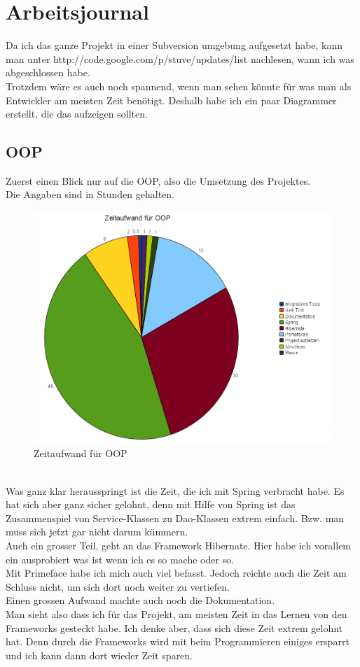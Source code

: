 \section{Arbeitsjournal}
Da ich das ganze Projekt in einer Subversion umgebung aufgesetzt habe, kann man unter http://code.google.com/p/stuve/updates/list nachlesen, wann ich was abgeschlossen habe.\\
 Trotzdem wäre es auch noch spannend, wenn man sehen könnte für was man als Entwickler am meisten Zeit benötigt. Deshalb habe ich ein paar Diagrammer erstellt, die das aufzeigen sollten.
\subsection{OOP}
Zuerst einen Blick nur auf die OOP, also die Umsetzung des Projektes.\\
Die Angaben sind in Stunden gehalten.
\begin{figure}[ht]
\begin{center}
\includegraphics[width=15cm]{images/OOP.png}
\caption{Zeitaufwand für OOP}
\end{center}
\end{figure}
\\
Was ganz klar herausspringt ist die Zeit, die ich mit Spring verbracht habe. Es hat sich aber ganz sicher gelohnt, denn mit Hilfe von Spring ist das Zusammenspiel von Service-Klassen zu Dao-Klassen extrem einfach. Bzw. man muss sich jetzt gar nicht darum kümmern.\\
Auch ein grosser Teil, geht an das Framework Hibernate. Hier habe ich vorallem ein ausprobiert was ist wenn ich es so mache oder so.\\
Mit Primeface habe ich mich auch viel befasst. Jedoch reichte auch die Zeit am Schluss nicht, um sich dort noch weiter zu vertiefen.\\
Einen grossen Aufwand machte auch noch die Dokumentation.\\[2ex]
Man sieht also dass ich für das Projekt, am meisten Zeit in das Lernen von den Frameworks gesteckt habe. Ich denke aber, dass sich diese Zeit extrem gelohnt hat. Denn durch die Frameworks wird mit beim Programmieren einiges ersparrt und ich kann dann dort wieder Zeit sparen.

